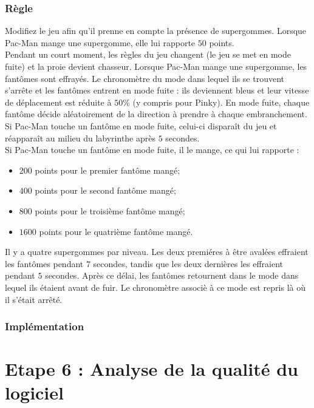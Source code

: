 \documentclass[12pt,a4paper,final]{article}
\begin{document}
\subsubsection{Règle}
Modifiez le jeu afin qu'il prenne en compte la présence de supergommes. Lorsque Pac-Man mange une supergomme, elle lui rapporte $50$ points.\\
Pendant un court moment, les règles du jeu changent (le jeu se met en mode fuite) et la proie devient chasseur. Lorsque Pac-Man mange une supergomme, les fantômes sont effrayés. Le chronomètre du mode dans lequel ils se trouvent s'arrête et les fantômes entrent en mode fuite : ils deviennent bleus et leur vitesse de déplacement est réduite à $50\%$ (y compris pour Pinky). En mode fuite, chaque fantôme décide aléatoirement
de la direction à prendre à chaque embranchement. Si Pac-Man touche un fantôme en mode fuite, celui-ci disparaît du jeu et réapparaît au milieu du labyrinthe après $5$ secondes.\\
Si Pac-Man touche un fantôme en mode fuite, il le mange, ce qui lui rapporte :
\begin{itemize}
\item $200$ points pour le premier fantôme mangé;
\item $400$ points pour le second fantôme mangé;
\item $800$ points pour le troisième fantôme mangé;
\item $1600$ points pour le quatrième fantôme mangé.
\end{itemize}
Il y a quatre supergommes par niveau. Les deux premiéres à être avalées effraient les fantômes pendant $7$ secondes, tandis que les deux dernières les effraient pendant $5$ secondes. Après ce délai, les fantômes retournent dans le mode dans lequel ils étaient avant de fuir. Le chronomètre associè à ce mode est repris là où il s'était arrêté.\\

\subsubsection{Implémentation}








\newpage
\section{Etape 6 : Analyse de la qualité du logiciel}\label{sec:etape6}
\end{document}

